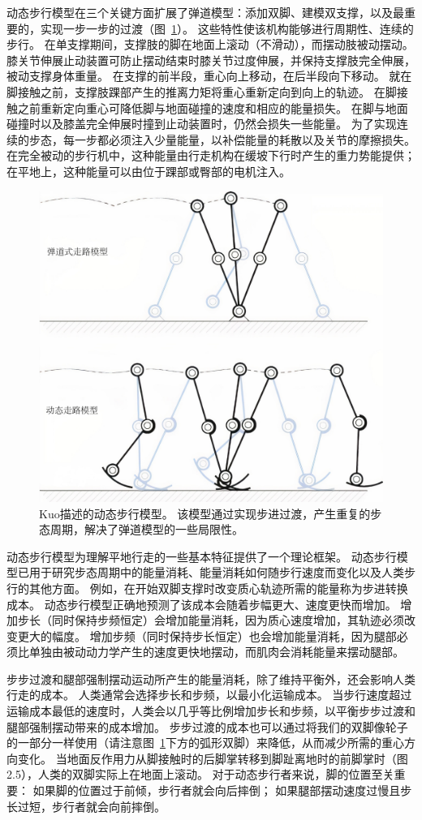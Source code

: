 动态步行模型在三个关键方面扩展了弹道模型：添加双脚、建模双支撑，以及最重要的，实现一步一步的过渡（图~\ref{fig:2_14}）。
这些特性使该机构能够进行周期性、连续的步行。
在单支撑期间，支撑肢的脚在地面上滚动（不滑动），而摆动肢被动摆动。
膝关节伸展止动装置可防止摆动结束时膝关节过度伸展，并保持支撑肢完全伸展，被动支撑身体重量。
在支撑的前半段，重心向上移动，在后半段向下移动。
就在脚接触之前，支撑肢踝部产生的推离力矩将重心重新定向到向上的轨迹。
在脚接触之前重新定向重心可降低脚与地面碰撞的速度和相应的能量损失。
在脚与地面碰撞时以及膝盖完全伸展时撞到止动装置时，仍然会损失一些能量。
为了实现连续的步态，每一步都必须注入少量能量，以补偿能量的耗散以及关节的摩擦损失。
在完全被动的步行机中，这种能量由行走机构在缓坡下行时产生的重力势能提供；
在平地上，这种能量可以由位于踝部或臀部的电机注入。


\begin{figure}[!htb]
	\centering
	\includegraphics[width=0.6\linewidth]{chap2/2_14}
	\caption{Kuo\cite{kuo2010dynamic}描述的动态步行模型。
		该模型通过实现步进过渡，产生重复的步态周期，解决了弹道模型的一些局限性。 \label{fig:2_14}}
\end{figure}


动态步行模型为理解平地行走的一些基本特征提供了一个理论框架。
动态步行模型已用于研究步态周期中的能量消耗、能量消耗如何随步行速度而变化以及人类步行的其他方面。
例如，在开始双脚支撑时改变质心轨迹所需的能量称为步进转换成本。
动态步行模型正确地预测了该成本会随着步幅更大、速度更快而增加。
增加步长（同时保持步频恒定）会增加能量消耗，因为质心速度增加，其轨迹必须改变更大的幅度。
增加步频（同时保持步长恒定）也会增加能量消耗，因为腿部必须比单独由被动动力学产生的速度更快地摆动，而肌肉会消耗能量来摆动腿部。


步步过渡和腿部强制摆动运动所产生的能量消耗，除了维持平衡外，还会影响人类行走的成本。
人类通常会选择步长和步频，以最小化运输成本。
当步行速度超过运输成本最低的速度时，人类会以几乎等比例增加步长和步频，以平衡步步过渡和腿部强制摆动带来的成本增加。
步步过渡的成本也可以通过将我们的双脚像轮子的一部分一样使用（请注意图~\ref{fig:2_14}下方的弧形双脚）来降低，从而减少所需的重心方向变化。
当地面反作用力从脚接触时的后脚掌转移到脚趾离地时的前脚掌时（图 2.5），人类的双脚实际上在地面上滚动。
对于动态步行者来说，脚的位置至关重要：
如果脚的位置过于前倾，步行者就会向后摔倒；
如果腿部摆动速度过慢且步长过短，步行者就会向前摔倒。



